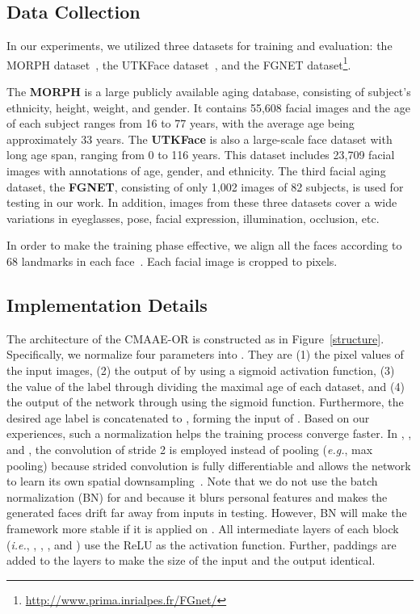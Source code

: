 \documentclass{article}
\begin{document}
\subsection{Data Collection}
In our experiments, we utilized three datasets for training and evaluation: the MORPH dataset~\cite{ricanek2006morph}, the UTKFace dataset~\cite{zhang2017age}, and the FGNET dataset\footnote{\url{http://www.prima.inrialpes.fr/FGnet/}}.



The {\bf MORPH} is a large publicly available aging database, consisting of subject's ethnicity, height, weight, and gender. It contains 55,608 facial images and the age of each subject ranges from 16 to 77 years, with the average age being approximately 33 years. The {\bf UTKFace} is also a large-scale face dataset with long age span, ranging from 0 to 116 years. This dataset includes 23,709 facial images with annotations of age, gender, and ethnicity. The third facial aging dataset, the {\bf FGNET}, consisting of only 1,002 images of 82 subjects, is used for testing in our work. In addition, images from these three datasets cover a wide variations in eyeglasses, pose, facial expression, illumination, occlusion, etc.

In order to make the training phase effective, we align all the faces according to 68 landmarks in each face~\cite{kazemi2014one}. Each facial image is cropped to  pixels.

\subsection{Implementation Details}
The architecture of the CMAAE-OR is constructed as in Figure~\ref{structure}. Specifically, we normalize four parameters into . They are (1) the pixel values of the input images, (2) the output  of  by using a sigmoid activation function, (3) the value of the label through dividing the maximal age of each dataset, and (4) the output of the network  through using the sigmoid function. Furthermore, the desired age label is concatenated to , forming the input of . Based on our experiences, such a normalization helps the training process converge faster. In , , and , the convolution of stride 2 is employed instead of pooling ({\it e.g.}, max pooling) because strided convolution is fully differentiable and allows the network to learn its own spatial downsampling~\cite{radford2015unsupervised}. Note that we do not use the batch normalization (BN) for  and  because it blurs personal features and makes the generated faces drift far away from inputs in testing. However, BN will make the framework more stable if it is applied on . All intermediate layers of each block ({\it i.e.}, , , , and ) use the ReLU as the activation function. Further, paddings are added to the layers to make the size of the input and the output identical.
\end{document}

